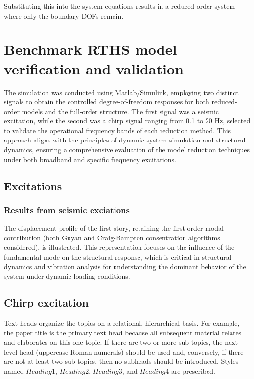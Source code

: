 \documentclass[a4paper, 10pt, conference]{ieeeconf}      %
\begin{document}
Substituting this into the system equations results in a reduced-order system where only the boundary DOFs remain.







\section{Benchmark RTHS model verification and validation} \label{sec4}

The simulation was conducted using Matlab/Simulink, employing two distinct signals to obtain the controlled degree-of-freedom responses for both reduced-order models and the full-order structure. The first signal was a seismic excitation, while the second was a chirp signal ranging from 0.1 to 20 Hz, selected to validate the operational frequency bands of each reduction method. This approach aligns with the principles of dynamic system simulation and structural dynamics, ensuring a comprehensive evaluation of the model reduction techniques under both broadband and specific frequency excitations.

\subsection{Excitations}

\subsubsection{Results from seismic exciations} \label{sec41}

The displacement profile of the first story, retaining the first-order modal contribution (both Guyan and Craig-Bampton consentration algorithms considered), is illustrated. This representation focuses on the influence of the fundamental mode on the structural response, which is critical in structural dynamics and vibration analysis for understanding the dominant behavior of the system under dynamic loading conditions.


\subsection{Chirp excitation}

Text heads organize the topics on a relational, hierarchical basis. For example, the paper title is the primary text head because all subsequent material relates and elaborates on this one topic. If there are two or more sub-topics, the next level head (uppercase Roman numerals) should be used and, conversely, if there are not at least two sub-topics, then no subheads should be introduced. Styles named $Heading 1$, $Heading 2$, $Heading 3$, and $Heading 4$ are prescribed.
\end{document}
